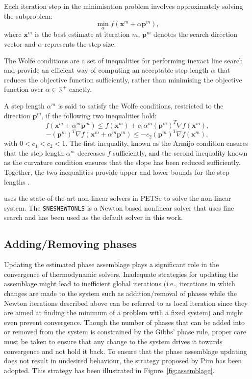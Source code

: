 	Each iteration step in the minimisation problem involves approximately solving the subproblem:
	\begin{equation}
		\min_\alpha f\left(\mathbf{x}^m + \alpha \mathbf{p}^m\right),
	\end{equation}
	where $\mathbf{x}^m$ is the best estimate at iteration $m$, $\mathbf{p}^m$ denotes the search direction vector and $\alpha$ represents the step size.

	The Wolfe conditions are a set of inequalities for performing inexact line search and provide an efficient way of computing an acceptable step length $\alpha$  that reduces the objective function sufficiently, rather than minimising the objective function over $\alpha \in \mathbb {R}^{+}$ exactly.

	A step length $\alpha^m$ is said to satisfy the Wolfe conditions, restricted to the direction $\mathbf{p}^m$, if the following two inequalities hold:
	\begin{equation}
		f\left(\mathbf{x}^m + \alpha^m \mathbf{p}^m\right) \leq f\left(\mathbf{x}^m \right) + c_1 \alpha^m \left(\mathbf{p}^m\right)^T \nabla f\left(\mathbf{x}^m \right),
	\end{equation}
	\begin{equation}
		- \left(\mathbf{p}^m\right)^T \nabla f\left(\mathbf{x}^m + \alpha^m \mathbf{p}^m\right) \leq - c_2 \left(\mathbf{p}^m\right)^T \nabla f\left(\mathbf{x}^m \right),
	\end{equation}
	with $0 < c_1 < c_2 < 1$. The first inequality, known as the Armijo condition ensures that the step length $\alpha^m$ decreases $f$ sufficiently, and the second inequality known as the curvature condition ensures that the slope has been reduced sufficiently. Together, the two inequalities provide upper and lower bounds for the step lengths \cite{Nocedal06}.
	
	{\GEM} uses the state-of-the-art non-linear solvers in PETSc to solve the non-linear system. The \texttt{SNESNEWTONLS} is a Newton based nonlinear solver that uses line search and has been used as the default solver in this work. 
	
	
\subsection{Adding/Removing phases}
    Updating the estimated phase assemblage plays a significant role in the convergence of thermodynamic solvers. Inadequate strategies for updating the assemblage might lead to inefficient global iterations (i.e., iterations in which changes are made to the system such as addition/removal of phases while the Newton iterations described above can be referred to as local iteration since they are aimed at finding the minimum of a problem with a fixed system) and might even prevent convergence. Though the number of phases that can be added into or removed from the system is constrained by the Gibbs' phase rule, proper care must be taken to ensure that any change to the system drives it towards convergence and not hold it back. To ensure that the phase assemblage updating does not result in undesired behaviour, the strategy proposed by Piro \cite{Piro17} has been adopted. This strategy has been illustrated in Figure~\ref{fig:assemblage}.
  
